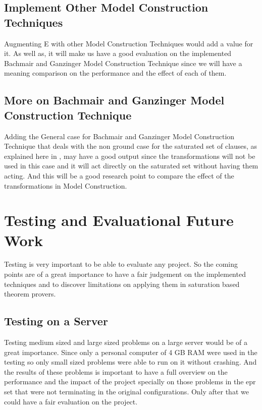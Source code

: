 		\subsection{Implement Other Model Construction Techniques}\label{sub:c7s1s3}
		Augmenting E with other Model Construction Techniques would add a value for it. As well as, it will make us have a good evaluation on the implemented Bachmair and Ganzinger Model Construction Technique since we will have a meaning comparison on the performance and the effect of each of them.
		
		\subsection{More on Bachmair and Ganzinger Model Construction Technique}\label{sub:c7s1s4}
		Adding the General case for Bachmair and Ganzinger Model Construction Technique that deals with the non ground %
		case for the saturated set of clauses, as explained here in \cite{BGMC}, may have a good output since the transformations will not be used in this case and it will act directly on the saturated set without having them acting. And this will be a good research point to compare the effect of the transformations in Model Construction.
		
		
	\section{Testing and Evaluational Future Work}\label{sec:c7s2}
	Testing is very important to be able to evaluate any project. So the coming points are of a great importance to have a fair judgement on the implemented techniques and to discover limitations on applying them in saturation based theorem provers.
		
		\subsection{Testing on a Server}\label{sub:c7s2s1}
		Testing medium sized and large sized problems on a large server would be of a great importance. Since only a personal computer of 4 GB RAM were used in the testing so only small sized problems were able to run on it without crashing. And the results of these problems is important to have a full overview on the performance and the impact of the project specially on those problems in the \ac{epr} set that were not terminating in the original configurations. Only after that we could have a fair evaluation on the project.  
		
